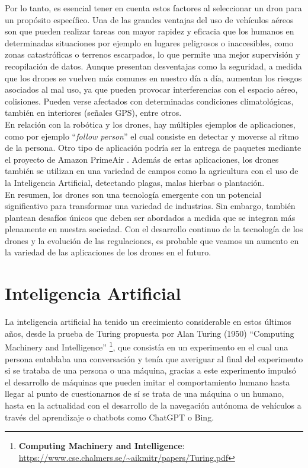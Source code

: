Por lo tanto, es esencial tener en cuenta estos factores al seleccionar un dron para un
propósito específico. Una de las grandes ventajas del uso de vehículos aéreos son que pueden
realizar tareas con mayor rapidez y eficacia que los humanos en determinadas situaciones por
ejemplo en lugares peligrosos o inaccesibles, como zonas catastróficas o terrenos escarpados,
lo que permite una mejor supervisión y recopilación de datos.\hfill
Aunque presentan desventajas como la seguridad, a medida que los drones se vuelven más
comunes en nuestro día a día, aumentan los riesgos asociados al mal uso, ya que pueden
provocar interferencias con el espacio aéreo, colisiones. Pueden verse afectados con
determinadas condiciones climatológicas, también en interiores (señales GPS), entre otros. \\

En relación con la robótica y los drones, hay múltiples ejemplos de aplicaciones, como por
ejemplo  “\textit{follow person}” \cite{PersonFollowing} el cual consiste en detectar y moverse al ritmo de la persona.
Otro tipo de aplicación podría ser la entrega de paquetes mediante el proyecto de Amazon PrimeAir \cite{AmazonPrimeAir}.
Además de estas aplicaciones, los drones también se utilizan en una variedad de campos como
la agricultura con el uso de la Inteligencia Artificial, detectando plagas, malas hierbas o
plantación. \\

En resumen, los drones son una tecnología emergente con un potencial significativo para
transformar una variedad de industrias. Sin embargo, también plantean desafíos únicos que
deben ser abordados a medida que se integran más plenamente en nuestra sociedad. Con el
desarrollo continuo de la tecnología de los drones y la evolución de las regulaciones, es
probable que veamos un aumento en la variedad de las aplicaciones de los
drones en el futuro.

\newpage
\section{Inteligencia Artificial}
\label{sec:IA}

La inteligencia artificial ha tenido un crecimiento considerable en estos últimos años, desde la
prueba de Turing propuesta por Alan Turing (1950) “Computing Machinery and Intelligence” \footnote{\textbf{Computing Machinery and Intelligence}: \url{https://www.cse.chalmers.se/~aikmitr/papers/Turing.pdf}},
que consistía en un experimento en el cual una persona entablaba una conversación y
tenía que averiguar al final del experimento si se trataba de una persona o una máquina,
gracias a este experimento impulsó el desarrollo de máquinas que pueden imitar el
comportamiento humano hasta llegar al punto de cuestionarnos de sí se trata de una máquina
o un humano, hasta en la actualidad con el desarrollo de la navegación autónoma de vehículos
a través del aprendizaje o chatbots como ChatGPT o Bing. \\

